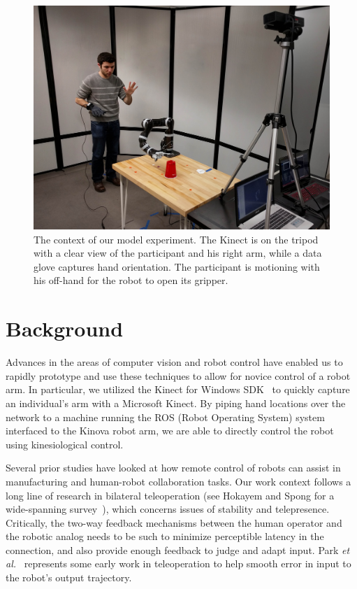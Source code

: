 \documentclass{sigchi}
\begin{document}
\begin{figure}[t]
	\centering
	\includegraphics[width=\columnwidth]{../Data/Figures/kinesiological_demo_2.jpg}
	\caption{The context of our model experiment.  The Kinect is on the tripod with a clear view of the participant and his right arm, while a data glove captures hand orientation.  The participant is motioning with his off-hand for the robot to open its gripper.}
	 \label{fig:demo}
\end{figure} 

\section{Background}

Advances in the areas of computer vision and robot control have enabled us to rapidly prototype and use these techniques to allow for novice control of a robot arm.  In particular, we utilized the Kinect for Windows SDK~\cite{Kinect} to quickly capture an individual's arm with a Microsoft Kinect.  By piping hand locations over the network to a machine running the ROS (Robot Operating System) system~\cite{ROS} interfaced to the Kinova robot arm, we are able to directly control the robot using kinesiological control.

Several prior studies have looked at how remote control of robots can assist in manufacturing and human-robot collaboration tasks. Our work context follows a long line of research in bilateral teleoperation (see Hokayem and Spong for a wide-spanning survey~\cite{hokayem2006bilateral}), which concerns issues of stability and telepresence.  Critically, the two-way feedback mechanisms between the human operator and the robotic analog needs to be such to minimize perceptible latency in the connection, and also provide enough feedback to judge and adapt input.  Park \emph{et al.}~\cite{park2003robust} represents some early work in teleoperation to help smooth error in input to the robot's output trajectory.  
\end{document}

